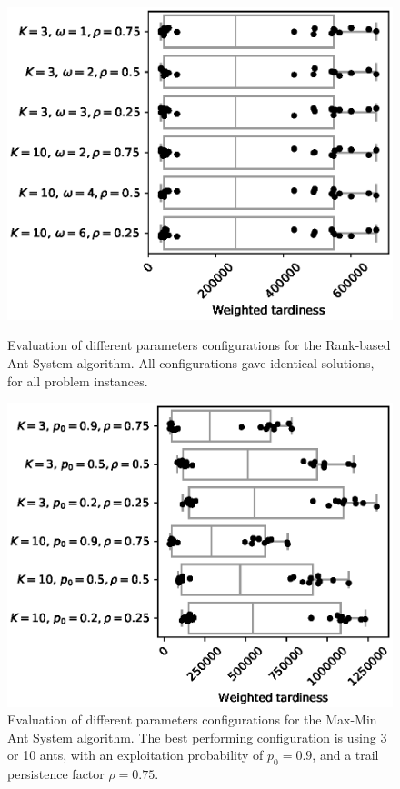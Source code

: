 \documentclass[runningheads]{llncs}
\begin{document}
\begin{figure}
    \centering
    \begin{minipage}{.48\textwidth}
		\centering
		\includegraphics[width=1.1\textwidth]{RankBasedAS-params.eps}
		\caption{Evaluation of different parameters configurations for the
		Rank-based Ant System algorithm. All configurations gave identical
		solutions, for all problem instances.}
		\label{RankBasedAS-params}
    \end{minipage}
    \hspace{0.02\textwidth}
    \begin{minipage}{.48\textwidth}
		\centering
		\includegraphics[width=1.1\textwidth]{MaxMinAS-params.eps}
		\caption{Evaluation of different parameters configurations for the Max-Min
		Ant System algorithm. The best performing configuration is using 3 or 10
		ants, with an exploitation probability of $p_0=0.9$, and a trail persistence
		factor $\rho=0.75$.}
		\label{MaxMinAS-params}
    \end{minipage}
\end{figure}
\end{document}
